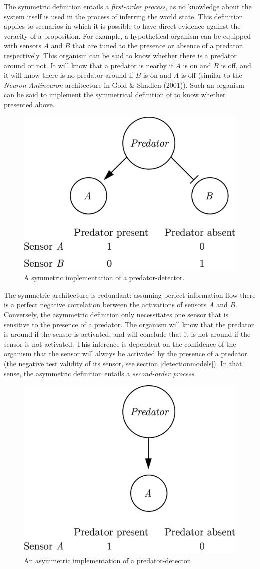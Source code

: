 \documentclass[12pt,twoside]{reedthesis}
\begin{document}
The symmetric definition entails a \emph{first-order process}, as no knowledge about the system itself is used in the process of inferring the world state. This definition applies to scenarios in which it is possible to have direct evidence against the veracity of a proposition. For example, a hypothetical organism can be equipped with sensors \(A\) and \(B\) that are tuned to the presence or absence of a predator, respectively. This organism can be said to know whether there is a predator around or not. It will know that a predator is nearby if \(A\) is on and \(B\) is off, and it will know there is no predator around if \(B\) is on and \(A\) is off (similar to the \emph{Neuron-Antineuron} architecture in Gold \& Shadlen (2001)). Such an organism can be said to implement the symmetrical definition of to know whether presented above.
\begin{figure}
\includegraphics[width=0.5\linewidth]{figure/intro/symmetric} \caption[A symmetric implementation of a predator-detector.]{A symmetric implementation of a predator-detector.}\label{fig:intro-symmetric}
\end{figure}
The symmetric architecture is redundant: assuming perfect information flow there is a perfect negative correlation between the activations of sensors \(A\) and \(B\). Conversely, the asymmetric definition only necessitates one sensor that is sensitive to the presence of a predator. The organism will know that the predator is around if the sensor is activated, and will conclude that it is not around if the sensor is not activated. This inference is dependent on the confidence of the organism that the sensor will always be activated by the presence of a predator (the negative test validity of its sensor, see section \ref{detectionmodels}). In that sense, the asymmetric definition entails a \emph{second-order process}.
\begin{figure}
\includegraphics[width=0.5\linewidth]{figure/intro/asymmetric} \caption[An asymmetric implementation of a predator-detector.]{An asymmetric implementation of a predator-detector.}\label{fig:intro-asymmetric}
\end{figure}
\end{document}
